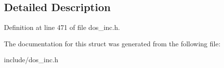\subsection{Detailed Description}


Definition at line 471 of file dos\-\_\-inc.\-h.



The documentation for this struct was generated from the following file\-:\begin{DoxyCompactItemize}
\item 
include/dos\-\_\-inc.\-h\end{DoxyCompactItemize}
